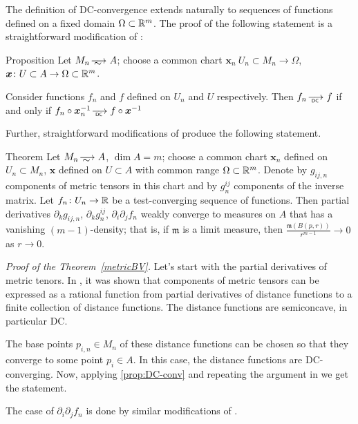 The definition of DC-convergence extends naturally to sequences of functions defined on a fixed domain $\Omega\subset \mathbb{R}^m$.
The proof of the following statement is a straightforward modification of \cite[Section 3]{PerDC}:

\begin{thm}{Proposition}\label{prop:DC-conv}
Let $M_n\smooths{} A$;
choose a common chart $\bm{x}_n\:U_n\subset M_n\to \Omega$, $\bm{x}\colon U\subset A\to \Omega\subset \mathbb{R}^m$.

Consider functions $f_n$ and $f$ defined on $U_n$ and $U$ respectively.
Then $f_n\DCto f$ if and only if $f_n\circ \bm{x}_n^{-1}\DCto f\circ \bm{x}^{-1}$
\end{thm}

Further, straightforward modifications of \cite[Section 4]{PerDC} produce the following statement.

\begin{thm}{Theorem}\label{metricBV}
Let $M_n\smooths{} A$, $\dim A=m$; choose a common chart $\bm{x}_n$ defined on $U_n\subset M_n$, $\bm{x}$ defined on $U\subset A$ with common range $\Omega\subset \mathbb{R}^m$.
Denote by $g_{ij,n}$ components of metric tensors in this chart
and by $g^{ij}_n$ components of the inverse matrix. 
Let $f_n\colon U_n\to \mathbb{R}$ be a test-converging sequence of functions.
Then partial derivatives $\partial_k g_{ij,n}$, $\partial_k g^{ij}_n$, $\partial_i\partial_jf_n$ weakly converge to measures on $A$ that has a vanishing $(m-1)$-density;
that is, if $\mathfrak{m}$ is a limit measure, then $\frac{\mathfrak{m}(B(p,r))}{r^{m-1}}\to 0$ as $r\to 0$.
\end{thm}


{\it Proof of the Theorem~\ref{metricBV}.}
Let's start with the partial derivatives of metric tenors.
In \cite[Section 4.2]{PerDC}, it was shown that components of metric tensors can be expressed as a rational function from partial derivatives of distance functions to a finite collection of distance functions.
The distance functions are semiconcave, in particular DC.

The base points $p_{i,n}\in M_n$ of these distance functions can be chosen so that they converge to some point $p_i\in A$.
In this case, the distance functions are DC-converging.
Now, applying \ref{prop:DC-conv} and repeating the argument in \cite[Section 4.3]{PerDC} we get the statement.

The case of $\partial_i\partial_jf_n$ is done by similar modifications of \cite[Section 4.4]{PerDC}.
\qeds






